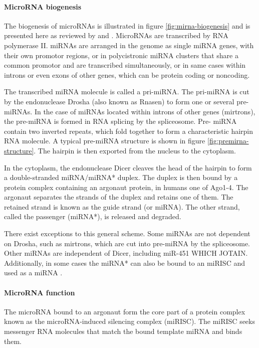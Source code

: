 \paragraph{MicroRNA biogenesis}\label{microrna-biogenesis}

The biogenesis of microRNAs is illustrated in figure
\ref{fig:mirna-biogenesis} and is presented here as reviewed by  
\citet{Bartel2004} and \citet{Denzler2015}. MicroRNAs are
transcribed by RNA polymerase II. miRNAs are arranged in the genome as
single miRNA genes, with their own promotor regions,
or in polycistronic miRNA clusters that share a common promotor and are
transcribed simultaneously, or in same cases within introns or even exons of
other genes, which can be protein coding or noncoding.

The transcribed miRNA molecule is called a pri-miRNA. The pri-miRNA is cut by
the endonuclease Drosha (also known as Rnasen) to form one or several pre-
miRNAs. In the case of miRNAs located within introns of other genes
(mirtrons), the pre-miRNA is formed in RNA splicing by the spliceosome. Pre-
miRNA contain two inverted repeats, which fold together to form a
characteristic hairpin RNA molecule. A typical pre-miRNA structure is shown in
figure \ref{fig:premirna-structure}. The hairpin is then exported from the
nucleus to the cytoplasm.

In the cytoplasm, the endonuclease Dicer cleaves the head of the hairpin to
form a double-stranded miRNA/miRNA* duplex. The duplex is then bound by a
protein complex containing an argonaut protein, in humans one of Ago1-4. The
argonaut separates the strands of the duplex and retains one of them. The
retained strand is known as the guide strand (or miRNA). The other strand,
called the passenger (miRNA*), is released and degraded.

There exist exceptions to this general scheme. Some miRNAs are not dependent
on Drosha, such as mirtrons, which are cut into pre-miRNA by the spliceosome.
Other miRNAs are independent of Dicer, including miR-451 WHICH JOTAIN.
Additionally, in some cases the miRNA* can also be bound to an miRISC and used
as a miRNA \citep{CITE}.





\paragraph{MicroRNA function}\label{microrna-function}

The microRNA bound to an argonaut form the core part of a protein complex
known as the microRNA-induced silencing complex (miRISC). The miRISC seeks
messenger RNA molecules that match the bound template miRNA and binds them.

